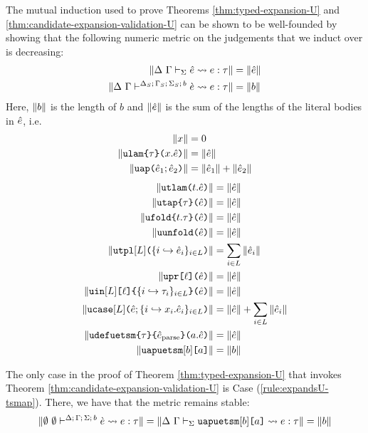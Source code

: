 The mutual induction used to prove Theorems \ref{thm:typed-expansion-U} and \ref{thm:candidate-expansion-validation-U} can be shown to be well-founded by showing that the following numeric metric on the judgements that we induct over is decreasing:
\begin{align*}
\Vert \Delta~\Gamma \vdash_{\Sigma} \hat{e} \leadsto e : \tau \Vert & = \Vert \hat{e} \Vert\\
\Vert \Delta~\Gamma\vdash^{\Delta_S;\,\Gamma_S;\,\Sigma_S;\,b} \grave{e} \leadsto e : \tau \Vert & = \Vert b \Vert
\end{align*}
Here, $\Vert b \Vert$ is the length of $b$ and $\Vert \hat{e} \Vert$ is the sum of the lengths of the literal bodies in $\hat{e}$, i.e. 
\begin{align*}
\Vert x \Vert & = 0\\
\Vert \texttt{ulam}\texttt{\{}\tau\texttt{\}(}x.\hat{e}\texttt{)} \Vert &= \Vert \hat{e} \Vert\\
\Vert \texttt{uap}\texttt{(}\hat{e}_1; \hat{e}_2\texttt{)} \Vert & = \Vert \hat{e}_1 \Vert + \Vert \hat{e}_2 \Vert
\end{align*}
\begin{align*}
\Vert \texttt{utlam}\texttt{(}t.\hat{e}\texttt{)} \Vert & = \Vert \hat{e} \Vert\\
\Vert \texttt{utap}\texttt{\{}\tau\texttt{\}(}\hat{e}\texttt{)} \Vert & = \Vert \hat{e} \Vert\\
\Vert \texttt{ufold}\texttt{\{}t.\tau\texttt{\}(}\hat{e}\texttt{)} \Vert & = \Vert \hat{e} \Vert\\
\Vert \texttt{uunfold}\texttt{(}\hat{e}\texttt{)} \Vert & = \Vert \hat{e} \Vert\\
\Vert \texttt{utpl}[L]\texttt{(}\{i \hookrightarrow \hat{e}_{i}\}_{i \in L}\texttt{)} \Vert & = \sum_{i \in L} \Vert \hat{e}_i \Vert\\
\Vert \texttt{upr}\texttt{[}\ell\texttt{](}\hat{e}\texttt{)} \Vert & = \Vert \hat{e} \Vert\\
\Vert \texttt{uin}[L]\texttt{[}\ell\texttt{]\{}\{i \hookrightarrow \tau_{i}\}_{i \in L}\texttt{\}(}\hat{e}\texttt{)} \Vert & = \Vert \hat{e} \Vert\\
\Vert \texttt{ucase}[L]\texttt{(}\hat{e}; \{i \hookrightarrow x_{i}.\hat{e}_{i}\}_{i \in L}\texttt{)} \Vert & = \Vert \hat{e} \Vert + \sum_{i \in L} \Vert \hat{e}_i \Vert\\
\Vert \texttt{udefuetsm}\texttt{\{}\tau\texttt{\}\{}\hat{e}_\text{parse}\texttt{\}(}a.\hat{e}\texttt{)} \Vert & = \Vert \hat{e} \Vert\\
\Vert \texttt{uapuetsm}[b]\texttt{[}a\texttt{]} \Vert & = \Vert b \Vert
\end{align*}

The only case in the proof of Theorem \ref{thm:typed-expansion-U} that invokes Theorem \ref{thm:candidate-expansion-validation-U} is Case (\ref{rule:expandsU-tsmap}). There, we have that the metric remains stable: \[\Vert \emptyset~\emptyset\vdash^{\Delta;\,\Gamma;\,\Sigma;\,b} \grave{e} \leadsto e : \tau \Vert = \Vert \Delta~\Gamma \vdash_{\Sigma} \texttt{uapuetsm}[b]\texttt{[}a\texttt{]} \leadsto e : \tau \Vert=\Vert b \Vert\]

